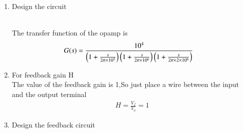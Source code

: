 \begin{enumerate}[label=\thesubsection.\arabic*.,ref=\thesubsection.\theenumi]
\item Design the circuit\\
\solution
\begin{figure}[ht!]
	\begin{center}
		\resizebox{\columnwidth}{!}{}
	\end{center}
	\caption{}
	\label{fig:ee18btech11029_block}
\end{figure}\\
The transfer function of the opamp is
\begin{align}
   G(s)&= \frac{10^{4}}{\left(1+\frac{s}{2\pi\times10^{5}}\right)\left(1+\frac{s}{2\pi\times10^{6}}\right)\left(1+\frac{s}{2\pi\times2\times10^{6}}\right)}
\end{align}
\item For feedback gain H\\
\solution
The value of the feedback gain is 1,So just place a wire between the input and the output terminal
\begin{align}
    H=\frac{V_{f}}{V_{o}}=1
\end{align}
\item Design the feedback circuit
\begin{figure}[ht!]
	\begin{center}
		\resizebox{\columnwidth}{!}{}
	\end{center}
	\caption{}
	\label{fig:ee18btech11029_fig1}
\end{figure}


































\end{enumerate}
